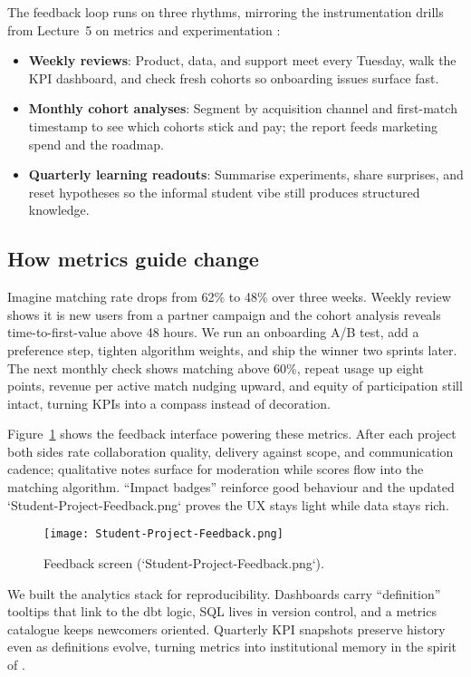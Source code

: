 The feedback loop runs on three rhythms, mirroring the instrumentation drills from Lecture~5 on metrics and experimentation \citep{Lecture05}:
\begin{itemize}
    \item \textbf{Weekly reviews}: Product, data, and support meet every Tuesday, walk the KPI dashboard, and check fresh cohorts so onboarding issues surface fast.
    \item \textbf{Monthly cohort analyses}: Segment by acquisition channel and first-match timestamp to see which cohorts stick and pay; the report feeds marketing spend and the roadmap.
    \item \textbf{Quarterly learning readouts}: Summarise experiments, share surprises, and reset hypotheses so the informal student vibe still produces structured knowledge.
\end{itemize}

\subsection*{How metrics guide change}
Imagine matching rate drops from 62\% to 48\% over three weeks. Weekly review shows it is new users from a partner campaign and the cohort analysis reveals time-to-first-value above 48 hours. We run an onboarding A/B test, add a preference step, tighten algorithm weights, and ship the winner two sprints later. The next monthly check shows matching above 60\%, repeat usage up eight points, revenue per active match nudging upward, and equity of participation still intact, turning KPIs into a compass instead of decoration.

Figure~\ref{fig:feedback-screen} shows the feedback interface powering these metrics. After each project both sides rate collaboration quality, delivery against scope, and communication cadence; qualitative notes surface for moderation while scores flow into the matching algorithm. ``Impact badges'' reinforce good behaviour and the updated `Student-Project-Feedback.png` proves the UX stays light while data stays rich.

\begin{figure}[H]
  \centering
  \texttt{[image: Student-Project-Feedback.png]}
  \caption{Feedback screen (`Student-Project-Feedback.png`).}
  \label{fig:feedback-screen}
\end{figure}

We built the analytics stack for reproducibility. Dashboards carry ``definition'' tooltips that link to the dbt logic, SQL lives in version control, and a metrics catalogue keeps newcomers oriented. Quarterly KPI snapshots preserve history even as definitions evolve, turning metrics into institutional memory in the spirit of \citet{Choudary2016}.
